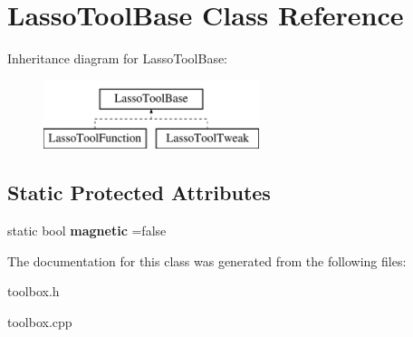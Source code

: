 \hypertarget{class_lasso_tool_base}{\section{Lasso\-Tool\-Base Class Reference}
\label{class_lasso_tool_base}
}
Inheritance diagram for Lasso\-Tool\-Base\-:\begin{figure}[H]
\begin{center}
\leavevmode
\includegraphics[height=2.000000cm]{class_lasso_tool_base}
\end{center}
\end{figure}
\subsection*{Static Protected Attributes}
\begin{DoxyCompactItemize}
\item 
\hypertarget{class_lasso_tool_base_aef6d6d2fd2e9994be1c6799e30e34f18}{static bool {\bfseries magnetic} =false}\label{class_lasso_tool_base_aef6d6d2fd2e9994be1c6799e30e34f18}

\end{DoxyCompactItemize}


The documentation for this class was generated from the following files\-:\begin{DoxyCompactItemize}
\item 
toolbox.\-h\item 
toolbox.\-cpp\end{DoxyCompactItemize}
